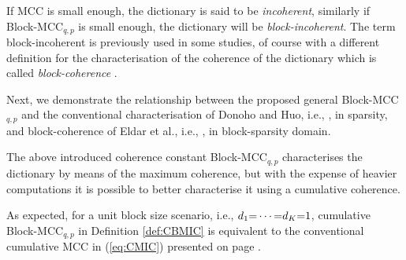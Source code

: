 



If MCC is small enough, the dictionary is said to be \emph{incoherent}, similarly if Block-MCC$_{q,p}$ is small enough, the dictionary will be \emph{block-incoherent}.
The term block-incoherent is previously used in some studies, of course with a different definition for the characterisation of the coherence of the dictionary which is called \emph{block-coherence} \cite{Peotta2007,Eldar2009b,Eldar2010b}. %

Next, we demonstrate the relationship between the proposed general Block-MCC$_{q,p}$ and the conventional characterisation of Donoho and Huo, i.e.,  \cite{Donoho2001}, in sparsity, and block-coherence of Eldar et al., i.e.,  \cite{Eldar2010}, in block-sparsity domain.


The above introduced coherence constant Block-MCC$_{q,p}$ characterises the dictionary by means of the maximum coherence, but with the expense of heavier computations it is possible to better characterise it using a cumulative coherence.


As expected, for a unit block size scenario, i.e., $d_1 {=} \cdots {=} d_K {=} 1$, cumulative Block-MCC$_{q,p}$ in Definition \ref{def:CBMIC} is equivalent to the conventional cumulative MCC in (\ref{eq:CMIC}) presented on page \pageref{eq:CMIC}.




